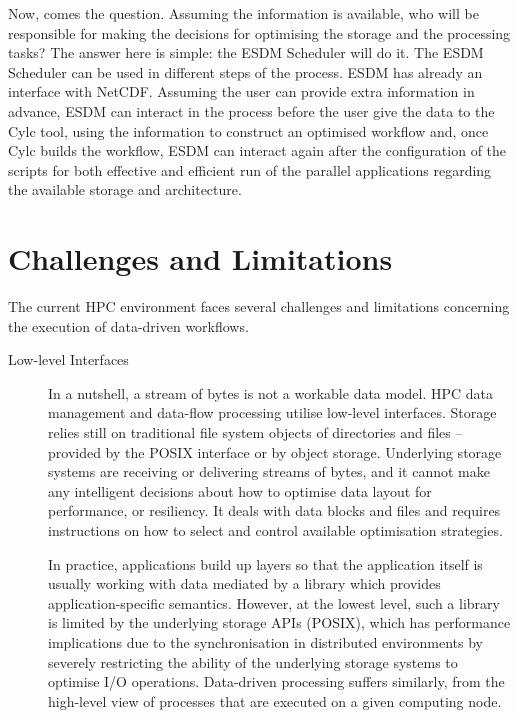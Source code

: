 \documentclass[a4paper]{article}
\begin{document}
{{{{\begin{itemize}
\end{itemize}

Now, comes the question. Assuming the information is available, who will be responsible for making the decisions for optimising the storage and the processing tasks? The answer here is simple: the ESDM Scheduler will do it. The ESDM Scheduler can be used in different steps of the process. ESDM has already an interface with NetCDF. Assuming the user can provide extra information in advance, ESDM can interact in the process before the user give the data to the Cylc tool, using the information to construct an optimised workflow and, once Cylc builds the workflow, ESDM can interact again after the configuration of the scripts for both effective and efficient run of the parallel applications regarding the available storage and architecture.

}}

\section{Challenges and Limitations}
\label{sec:challenges}
The current HPC environment faces several challenges and limitations concerning the execution of data-driven workflows.

\begin{description}

\item[Low-level Interfaces]

In a nutshell, a stream of bytes is not a workable data model.
HPC data management and data-flow processing utilise low-level interfaces.
Storage relies still on traditional file system objects of directories and files -- provided by the POSIX interface or by object storage.
Underlying storage systems are receiving or delivering streams of bytes, and it cannot make any intelligent decisions about how to optimise data layout for performance, or resiliency.
It deals with data blocks and files and requires instructions on how to select and control available optimisation strategies.

In practice, applications build up layers so that the application itself is usually working with data mediated by a library which provides application-specific semantics. However, at the lowest level, such a library is limited by the underlying storage APIs (POSIX),
which has performance implications due to the synchronisation in distributed environments by severely restricting the ability of the underlying storage systems to optimise I/O operations.
Data-driven processing suffers similarly, from the high-level view of processes that are executed on a given computing node.


\end{description}}}
\end{document}
